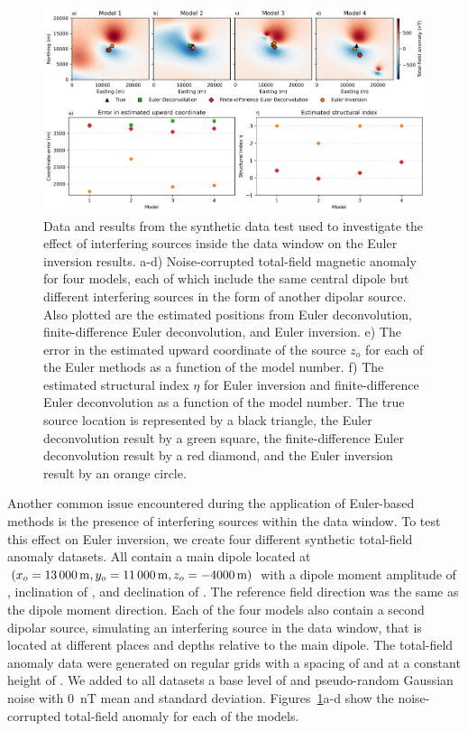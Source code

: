 \begin{figure}[tb!]
\centering
\includegraphics[width=1\linewidth]{figures/synthetic-interfering-sources.png}
\caption{
    Data and results from the synthetic data test used to investigate the effect of interfering sources inside the data window on the Euler inversion results.
    a-d) Noise-corrupted total-field magnetic anomaly for four models, each of which include the same central dipole but different interfering sources in the form of another dipolar source. Also plotted are the estimated positions from Euler deconvolution, finite-difference Euler deconvolution, and Euler inversion.
    e) The error in the estimated upward coordinate of the source $z_o$ for each of the Euler methods as a function of the model number.
    f) The estimated structural index $\eta$ for Euler inversion and finite-difference Euler deconvolution as a function of the model number.
    The true source location is represented by a black triangle, the Euler deconvolution result by a green square, the finite-difference Euler deconvolution result by a red diamond, and the Euler inversion result by an orange circle.
}
\label{fig:interf}
\end{figure}

Another common issue encountered during the application of Euler-based methods is the presence of interfering sources within the data window.
To test this effect on Euler inversion, we create four different synthetic total-field anomaly datasets.
All contain a main dipole located at $(x_o=\SynInterfTrueEast, y_o=\SynInterfTrueNorth, z_o=\SynInterfTrueUp)$ with a dipole moment amplitude of \SynInterfInt{}, inclination of \SynInterfInc, and declination of \SynInterfDec.
The reference field direction was the same as the dipole moment direction.
Each of the four models also contain a second dipolar source, simulating an interfering source in the data window, that is located at different places and depths relative to the main dipole.
The total-field anomaly data were generated on regular grids with a spacing of \SynInterfSpacing{} and at a constant height of \SynInterfHeight.
We added to all datasets a base level of \SynInterfTrueBase{} and pseudo-random Gaussian noise with \qty{0}{\nano\tesla} mean and \SynInterfNoise{} standard deviation.
Figures~\ref{fig:interf}a-d show the noise-corrupted total-field anomaly for each of the models.

